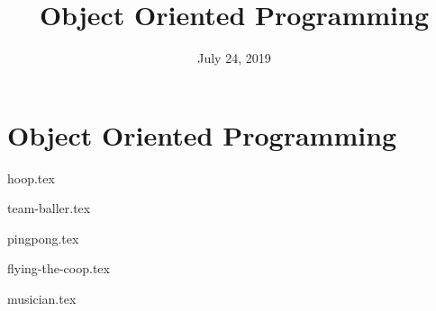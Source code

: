 \documentclass{exam}
\title{Object Oriented Programming }
\date{July 24, 2019}
\begin{document}
\maketitle

\section{Object Oriented Programming}
\begin{questions}
{hoop.tex}

{team-baller.tex}

{pingpong.tex}

{flying-the-coop.tex}

{musician.tex}

\end{questions}
\end{document}

